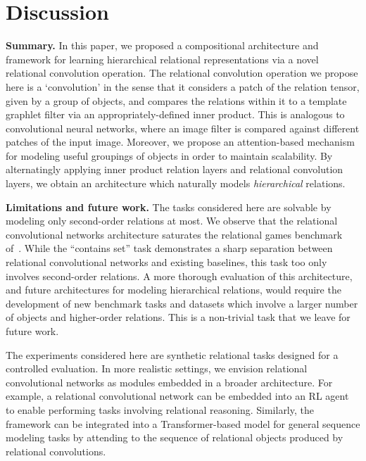 
\section{Discussion}\label{sec:discussion}

\textbf{Summary.} In this paper, we proposed a compositional architecture and framework for learning hierarchical relational representations via a novel relational convolution operation. The relational convolution operation we propose here is a `convolution' in the sense that it considers a patch of the relation tensor, given by a group of objects, and compares the relations within it to a template graphlet filter via an appropriately-defined inner product. This is analogous to convolutional neural networks, where an image filter is compared against different patches of the input image. Moreover, we propose an attention-based mechanism for modeling useful groupings of objects in order to maintain scalability. By alternatingly applying inner product relation layers and relational convolution layers, we obtain an architecture which naturally models \textit{hierarchical} relations.


\textbf{Limitations and future work.} The tasks considered here are solvable by modeling only second-order relations at most. We observe that the relational convolutional networks architecture saturates the relational games benchmark of~\citep{shanahanExplicitlyRelationalNeural}. While the ``contains set'' task demonstrates a sharp separation between relational convolutional networks and existing baselines, this task too only involves second-order relations.
A more thorough evaluation of this architecture, and future architectures for modeling hierarchical relations, would require the development of new benchmark tasks and datasets which involve a larger number of objects and higher-order relations. This is a non-trivial task that we leave for future work.

The experiments considered here are synthetic relational tasks designed for a controlled evaluation. In more realistic settings, we envision relational convolutional networks as modules embedded in a broader architecture. For example, a relational convolutional network can be embedded into an RL agent to enable performing tasks involving relational reasoning. Similarly, the framework can be integrated into a Transformer-based model for general sequence modeling tasks by attending to the sequence of relational objects produced by relational convolutions.